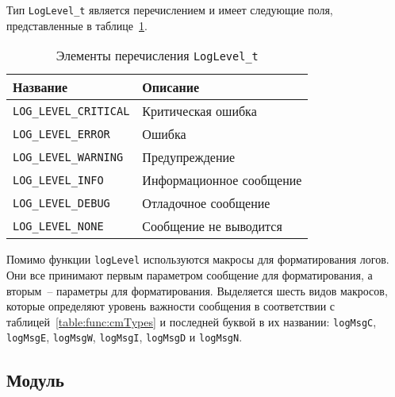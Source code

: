 Тип \lstinline{LogLevel_t} является перечислением и имеет следующие поля, представленные в таблице~\ref{table:func:logLevel}.

\begin{table}[ht]
    \caption{Элементы перечисления \lstinline{LogLevel_t}}
    \label{table:func:logLevel}
    \begin{tabular}{| >{\raggedright}m{}
                    | >{\raggedright\arraybackslash}m{}|}
        \hline
        \centering Название & \centering\arraybackslash Описание \\

        \hline
        \lstinline[]$LOG_LEVEL_CRITICAL$ &
        Критическая ошибка
        \\

        \hline
        \lstinline[]$LOG_LEVEL_ERROR$ &
        Ошибка
        \\

        \hline
        \lstinline[]$LOG_LEVEL_WARNING$ &
        Предупреждение
        \\

        \hline
        \lstinline[]$LOG_LEVEL_INFO$ &
        Информационное сообщение
        \\

        \hline
        \lstinline[]$LOG_LEVEL_DEBUG$ &
        Отладочное сообщение
        \\

        \hline
        \lstinline[]$LOG_LEVEL_NONE$ &
        Сообщение не выводится
        \\

        \hline
    \end{tabular}
\end{table}

Помимо функции \lstinline{logLevel} используются макросы для форматирования логов. Они все принимают первым параметром сообщение для форматирования, а вторым~-- параметры для
форматирования. Выделяется шесть видов макросов, которые определяют уровень
важности сообщения в соответствии с таблицей~\ref{table:func:cmTypes}
и последней буквой в их названии: \lstinline{logMsgC}, \lstinline{logMsgE}, \lstinline{logMsgW},
\lstinline{logMsgI}, \lstinline{logMsgD} и \lstinline{logMsgN}.

\subsection{Модуль \moduleCfg}

